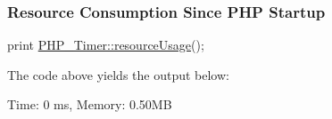 \subsubsection*{Resource Consumption Since P\+HP Startup}


\begin{DoxyCode}
print \mbox{\hyperlink{class_p_h_p___timer_a0497d98146ffede423c66e0c3dc401c8}{PHP\_Timer::resourceUsage}}();
\end{DoxyCode}


The code above yields the output below\+: \begin{DoxyVerb}Time: 0 ms, Memory: 0.50MB\end{DoxyVerb}
 